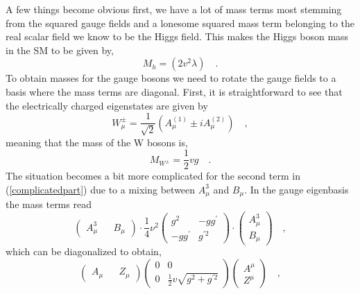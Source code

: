 %
A few things become obvious first, we have a lot of mass terms most stemming from the squared gauge fields and a lonesome squared mass term belonging to the real scalar field we know to be the Higgs field. This makes the Higgs boson mass in the SM to be given by,
%
\begin{equation}
M_h= (2v^2 \lambda) \quad .  
\end{equation}
%
To obtain masses for the gauge bosons we need to rotate the gauge fields to a basis where the mass terms are diagonal. First, it is straightforward to see that the electrically charged eigenstates are given by %
\begin{equation}
W^\pm_\mu = \frac{1}{\sqrt{2}} (A^{(1)}_\mu \pm i A^{(2)}_\mu) \quad , 
\label{gagestate}
\end{equation}
meaning that the mass of the W bosons is, 
\begin{equation}
M_{W^\pm}= \frac{1}{2} v g \quad .
\end{equation}
%
The situation becomes a bit more complicated for the second term in (\ref{complicatedpart}) due to a mixing between $A_\mu^3$ and $B_\mu$. In the gauge eigenbasis the mass terms read
%
\begin{equation}
\begin{pmatrix}
A_\mu^3 && B_\mu
\end{pmatrix} \cdot  \frac{1}{4} \nu ^2 \begin{pmatrix}
g^2  & -g g^\prime \\
-g g^\prime & g^{\prime 2} 
\end{pmatrix} \cdot \begin{pmatrix}
A_\mu^3 \\  B_\mu
\end{pmatrix}  \quad , 
\end{equation} 
%
which can be diagonalized to obtain,
%
\begin{equation}
\begin{pmatrix}
A_\mu && Z_\mu 
\end{pmatrix} \begin{pmatrix}
0  & 0 \\
0  & \frac{1}{2} v \sqrt{g^2 + g^{\prime 2}} 
\end{pmatrix}  \begin{pmatrix}
A^\mu \\ Z^\mu
\end{pmatrix}  \quad , 
\end{equation}
